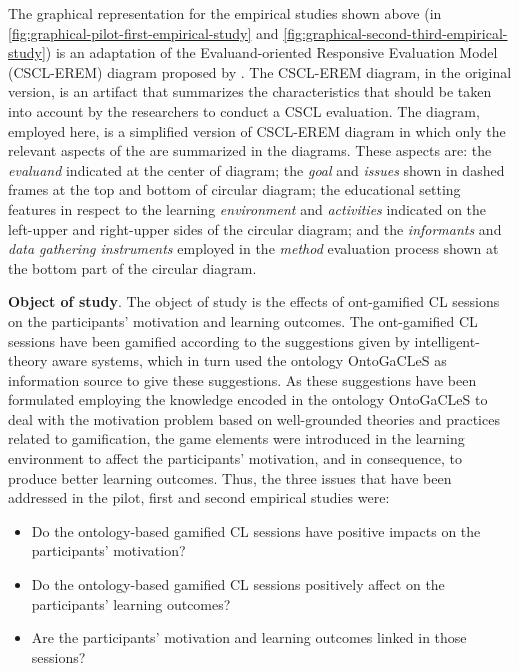 \newpage
The graphical representation for the empirical studies shown above (in \autoref{fig:graphical-pilot-first-empirical-study} and \autoref{fig:graphical-second-third-empirical-study}) is an adaptation of the Evaluand-oriented Responsive Evaluation Model (CSCL-EREM) diagram proposed by . The CSCL-EREM diagram, in the original version, is an artifact that summarizes the characteristics that should be taken into account by the researchers to conduct a CSCL evaluation. The diagram, employed here, is a simplified version of CSCL-EREM diagram in which only the relevant aspects of the  are summarized in the diagrams. These aspects are: the \emph{evaluand} indicated at the center of diagram; the \emph{goal} and \emph{issues} shown in dashed frames at the top and bottom of circular diagram; the educational setting features in respect to the learning \emph{environment} and \emph{activities} indicated on the left-upper and right-upper sides of the circular diagram; and the \emph{informants} and \emph{data gathering instruments} employed in the \emph{method} evaluation process shown at the bottom part of the circular diagram.

\textbf{Object of study}. The object of study is the effects of ont-gamified CL sessions on the participants' motivation and learning outcomes. The ont-gamified CL sessions have been gamified according to the suggestions given by intelligent-theory aware systems, which in turn used the ontology OntoGaCLeS as information source to give these suggestions. 
As these suggestions have been formulated employing the knowledge encoded in the ontology OntoGaCLeS to deal with the motivation problem based on well-grounded theories and practices related to gamification, the game elements were introduced in the learning environment to affect the participants' motivation, and in consequence, to produce better learning outcomes. Thus, the three issues that have been addressed in the pilot, first and second empirical studies were:

\begin{itemize}
\item Do the ontology-based gamified CL sessions have positive impacts on the participants' motivation?
\item Do the ontology-based gamified CL sessions positively affect on the participants' learning outcomes?
\item Are the participants' motivation and learning outcomes linked in those sessions?
\end{itemize}

